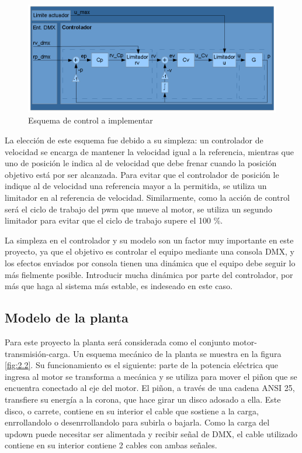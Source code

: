\begin{figure}[!ht]
	\centering
	\includegraphics[width=16cm,scale=1]{resources/2_1-diagramaControlador.png}
	\caption{Esquema de control a implementar}
	\label{fig:\thefigure}
\end{figure}

La elección de este esquema fue debido a su simpleza: un controlador de velocidad se encarga de mantener la velocidad igual a la referencia, mientras que uno de posición le indica al de velocidad que debe frenar cuando la posición objetivo está por ser alcanzada. Para evitar que el controlador de posición le indique al de velocidad una referencia mayor a la permitida, se utiliza un limitador en al referencia de velocidad. Similarmente, como la acción de control será el ciclo de trabajo del pwm que mueve al motor, se utiliza un segundo limitador para evitar que el ciclo de trabajo supere el 100 \%.

La simpleza en el controlador y su modelo son un factor muy importante en este proyecto, ya que el objetivo es controlar el equipo mediante una consola DMX, y los efectos enviados por consola tienen una dinámica que el equipo debe seguir lo más fielmente posible. Introducir mucha dinámica por parte del controlador, por más que haga al sistema más estable, es indeseado en este caso. 

\subsection{Modelo de la planta}
Para este proyecto la planta será considerada como el conjunto motor-transmisión-carga. Un esquema mecánico de la planta se muestra en la figura \ref{fig:2.2}. Su funcionamiento es el siguiente: parte de la potencia eléctrica que ingresa al motor se transforma a mecánica y se utiliza para mover el piñon que se encuentra conectado al eje del motor. El piñon, a través de una cadena ANSI 25, transfiere su energía a la corona, que hace girar un disco adosado a ella. Este disco, o carrete, contiene en su interior el cable que sostiene a la carga, enrrollandolo o desenrrollandolo para subirla o bajarla. Como la carga del updown puede necesitar ser alimentada y recibir señal de DMX, el cable utilizado contiene en su interior contiene 2 cables con ambas señales.

